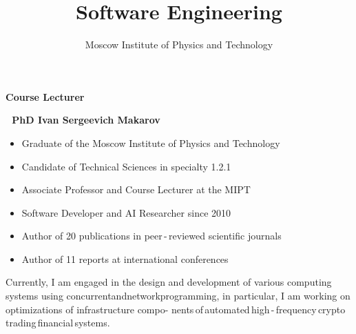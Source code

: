 \documentclass{beamer}
\begin{document}
\title{\bf Software Engineering} 

\author{Moscow Institute of Physics and Technology}

\date{}

\frame{\titlepage}



\begin{frame}{\bf Course Lecturer}

    \textbf{\;\;\;\;\,\,\,\,PhD Ivan Sergeevich Makarov}

    \bigskip
    
    \begin{itemize}

        \item Graduate of the Moscow Institute of Physics and Technology

        \item Candidate of Technical Sciences in specialty 1.2.1

        \item Associate Professor and Course Lecturer at the MIPT

        \item Software Developer and AI Researcher since 2010

        \item Author of 20 publications in peer\,-\,reviewed scientific journals
    
        \item Author of 11 reports at international conferences
        
    \end{itemize}

    \begin{block}
    \justifying Currently, I am engaged in the design and development of various computing systems using concurrent\:and\:network\:programming, in particular, I am working on optimizations of infrastructure compo- nents\,of\,automated\,high\,-\,frequency\,crypto\,trading\,financial\,systems.
    \end{block}
    
\end{frame}
\end{document}
